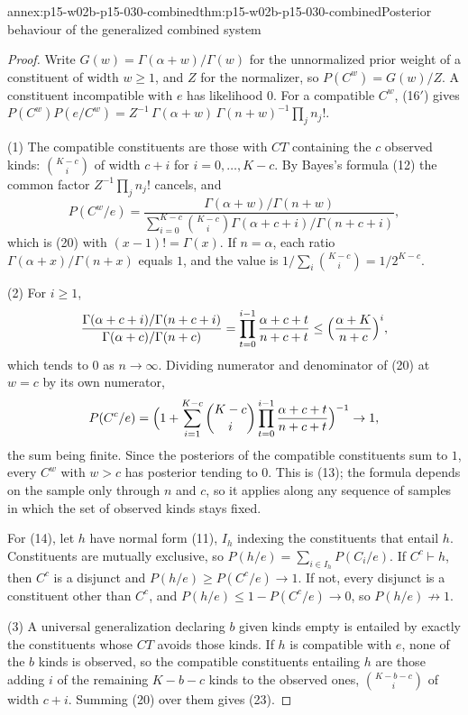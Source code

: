 \begin{annexitem}{annex:p15-w02b-p15-030-combined}{thm:p15-w02b-p15-030-combined}{Posterior behaviour of the generalized combined system}
\begin{proof}
Write \(G(w)=\Gamma(\alpha+w)/\Gamma(w)\) for the unnormalized prior weight
of a constituent of width \(w\geq1\), and \(Z\) for the normalizer, so
\(P(C^w)=G(w)/Z\). A constituent incompatible with \(e\) has likelihood \(0\).
For a compatible \(C^w\), (16\('\)) gives
\(P(C^w)P(e/C^w)=Z^{-1}\,\Gamma(\alpha+w)\,\Gamma(n+w)^{-1}\prod_j n_j!\).

(1) The compatible constituents are those with \(CT\) containing the \(c\)
observed kinds: \(\binom{K-c}{i}\) of width \(c+i\) for \(i=0,\ldots,K-c\). By
Bayes's formula (12) the common factor \(Z^{-1}\prod_jn_j!\) cancels, and
\[
 P(C^w/e)=\frac{\Gamma(\alpha+w)/\Gamma(n+w)}
 {\sum_{i=0}^{K-c}\binom{K-c}{i}\Gamma(\alpha+c+i)/\Gamma(n+c+i)},
\]
which is (20) with \((x-1)!=\Gamma(x)\). If \(n=\alpha\), each ratio
\(\Gamma(\alpha+x)/\Gamma(n+x)\) equals \(1\), and the value is
\(1/\sum_i\binom{K-c}i=1/2^{K-c}\).

(2) For \(i\geq1\),
\[
 \frac{\Gamma(\alpha+c+i)/\Gamma(n+c+i)}{\Gamma(\alpha+c)/\Gamma(n+c)}
 =\prod_{t=0}^{i-1}\frac{\alpha+c+t}{n+c+t}
 \leq\Bigl(\frac{\alpha+K}{n+c}\Bigr)^{i},
\]
which tends to \(0\) as \(n\to\infty\). Dividing numerator and denominator of
(20) at \(w=c\) by its own numerator,
\[
 P(C^c/e)=\Bigl(1+\sum_{i=1}^{K-c}\binom{K-c}{i}\prod_{t=0}^{i-1}\frac{\alpha+c+t}{n+c+t}\Bigr)^{-1}\to1,
\]
the sum being finite. Since the posteriors of the compatible constituents
sum to \(1\), every \(C^w\) with \(w>c\) has posterior tending to \(0\). This is
(13); the formula depends on the sample only through \(n\) and \(c\), so it
applies along any sequence of samples in which the set of observed kinds
stays fixed.

For (14), let \(h\) have normal form (11), \(I_h\) indexing the constituents
that entail \(h\). Constituents are mutually exclusive, so
\(P(h/e)=\sum_{i\in I_h}P(C_i/e)\). If \(C^c\vdash h\), then \(C^c\) is a
disjunct and \(P(h/e)\geq P(C^c/e)\to1\). If not, every disjunct is a
constituent other than \(C^c\), and \(P(h/e)\leq1-P(C^c/e)\to0\), so
\(P(h/e)\not\to1\).

(3) A universal generalization declaring \(b\) given kinds empty is entailed
by exactly the constituents whose \(CT\) avoids those kinds. If \(h\) is
compatible with \(e\), none of the \(b\) kinds is observed, so the compatible
constituents entailing \(h\) are those adding \(i\) of the remaining
\(K-b-c\) kinds to the observed ones, \(\binom{K-b-c}{i}\) of width \(c+i\).
Summing (20) over them gives (23).


\end{proof}
\end{annexitem}
